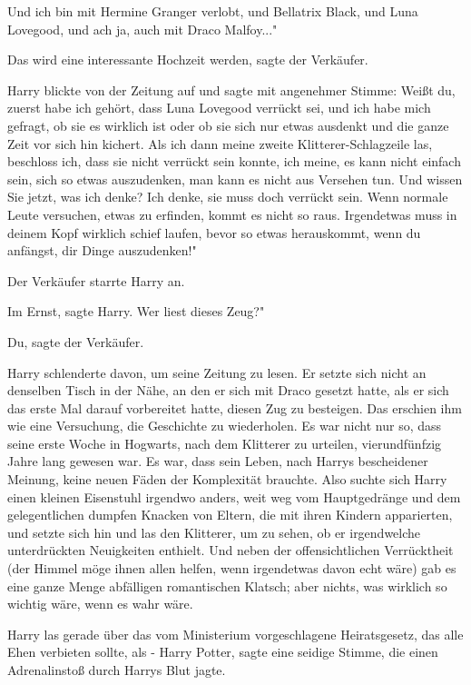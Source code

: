 \glqq Und ich bin mit Hermine Granger verlobt, und Bellatrix Black, und Luna
Lovegood, und ach ja, auch mit Draco Malfoy..."

\glqq Das wird eine interessante Hochzeit werden\grqq{}, sagte der Verkäufer.

Harry blickte von der Zeitung auf und sagte mit angenehmer Stimme: \glqq Weißt
du, zuerst habe ich gehört, dass Luna Lovegood verrückt sei, und ich habe mich
gefragt, ob sie es wirklich ist oder ob sie sich nur etwas ausdenkt und die
ganze Zeit vor sich hin kichert. Als ich dann meine zweite Klitterer-Schlagzeile
las, beschloss ich, dass sie nicht verrückt sein konnte, ich meine, es kann
nicht einfach sein, sich so etwas auszudenken, man kann es nicht aus Versehen
tun. Und wissen Sie jetzt, was ich denke? Ich denke, sie muss doch verrückt
sein. Wenn normale Leute versuchen, etwas zu erfinden, kommt es nicht so raus.
Irgendetwas muss in deinem Kopf wirklich schief laufen, bevor so etwas
herauskommt, wenn du anfängst, dir Dinge auszudenken!"

Der Verkäufer starrte Harry an.

\glqq Im Ernst\grqq{}, sagte Harry. \glqq Wer liest dieses Zeug?"

\glqq Du\grqq{}, sagte der Verkäufer.

Harry schlenderte davon, um seine Zeitung zu lesen. Er setzte sich nicht an
denselben Tisch in der Nähe, an den er sich mit Draco gesetzt hatte, als er sich
das erste Mal darauf vorbereitet hatte, diesen Zug zu besteigen. Das erschien
ihm wie eine Versuchung, die Geschichte zu wiederholen. Es war nicht nur so,
dass seine erste Woche in Hogwarts, nach dem Klitterer zu urteilen,
vierundfünfzig Jahre lang gewesen war. Es war, dass sein Leben, nach Harrys
bescheidener Meinung, keine neuen Fäden der Komplexität brauchte. Also suchte
sich Harry einen kleinen Eisenstuhl irgendwo anders, weit weg vom Hauptgedränge
und dem gelegentlichen dumpfen Knacken von Eltern, die mit ihren Kindern
apparierten, und setzte sich hin und las den Klitterer, um zu sehen, ob er
irgendwelche unterdrückten Neuigkeiten enthielt. Und neben der offensichtlichen
Verrücktheit (der Himmel möge ihnen allen helfen, wenn irgendetwas davon echt
wäre) gab es eine ganze Menge abfälligen romantischen Klatsch; aber nichts, was
wirklich so wichtig wäre, wenn es wahr wäre.

Harry las gerade über das vom Ministerium vorgeschlagene Heiratsgesetz, das alle
Ehen verbieten sollte, als - \glqq Harry Potter\grqq{}, sagte eine seidige
Stimme, die einen Adrenalinstoß durch Harrys Blut jagte.

